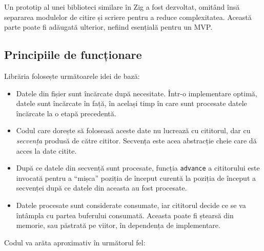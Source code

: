\documentclass[a4paper,12pt]{report}
\begin{document}
Un prototip al unei biblioteci similare în Zig a fost dezvoltat,
omitând însă separarea modulelor de citire și scriere pentru a reduce complexitatea.
Această parte poate fi adăugată ulterior, nefiind esențială pentru un \ac{MVP}.

\subsection{Principiile de funcționare}

Librăria folosește următoarele idei de bază:
\begin{itemize}
    \item 
        Datele din fișier sunt încărcate după necesitate.
        Într-o implementare optimă, datele sunt încărcate în față, în același timp în care sunt procesate
        datele încărcate la o etapă precedentă.

    \item
        Codul care dorește să foloseasă aceste date nu lucrează cu cititorul,
        dar cu \textit{secvența} produsă de către cititor.
        Secvența este acea abstracție cheie care dă acces la date citite.

    \item
        După ce datele din secvență sunt procesate,
        funcția \texttt{advance} a cititorului este invocată pentru
        a ``mișca'' poziția de început curentă la poziția de început 
        a secvenței după ce datele din aceasta au fost procesate.

    \item
        Datele procesate sunt considerate consumate,
        iar cititorul decide ce se va întâmpla cu partea buferului consumată.
        Aceasta poate fi ștearsă din memorie, sau păstrată pe viitor, în dependența de implementare.
\end{itemize}

Codul va arăta aproximativ în următorul fel:
\end{document}

